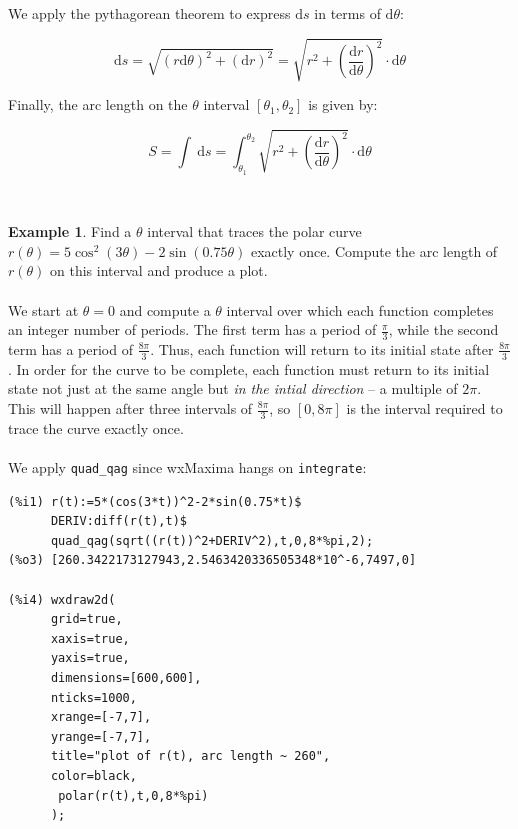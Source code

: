 \documentclass[10.5pt,twoside]{report}
\theoremstyle{definition}
\newtheorem{exmp}{Example}[section]
\begin{document}
We apply the pythagorean theorem to express $\mathrm{d}s$ in terms of $\mathrm{d}\theta$:

\[\mathrm{d}s=\sqrt{(r\mathrm{d}\theta)^2+(\mathrm{d}r)^2}=
\sqrt{r^2+\left(\frac{\mathrm{d}r}{\mathrm{d}\theta}\right)^2} \cdot \mathrm{d}\theta\]

Finally, the arc length on the $\theta$ interval $[\theta_1,\theta_2]$ is given by:

\[S=\int \ \mathrm{d}s = \int_{\theta_1}^{\theta_2} 
\sqrt{r^2+\left(\frac{\mathrm{d}r}{\mathrm{d}\theta}\right)^2} \cdot \mathrm{d}\theta\]

${}$\\

\begin{exmp}  Find a $\theta$ interval that traces the polar curve $r(\theta)=5\cos^2{(3\theta)}-2\sin{(0.75\theta)}$ exactly once.  Compute the arc length of $r(\theta)$ on this interval and produce a plot.\\

${}$\\



We start at $\theta=0$ and compute a $\theta$ interval over which each function completes an integer number of periods.  The first term has a period of $\frac{\pi}{3}$, while the second term has a period of $\frac{8\pi}{3}$.  Thus, each function will return to its initial state after $\frac{8\pi}{3}$.  In order for the curve to be complete, each function must return to its initial state not just at the same angle but \textit{in the intial direction} -- a multiple of $2\pi$.  This will happen after three intervals of $\frac{8\pi}{3}$, so $[0,8\pi]$ is the interval required to trace the curve exactly once.\\

${}$\\

We apply \verb|quad_qag| since wxMaxima hangs on \verb|integrate|:

\begin{verbatim}
(%i1) r(t):=5*(cos(3*t))^2-2*sin(0.75*t)$
      DERIV:diff(r(t),t)$
      quad_qag(sqrt((r(t))^2+DERIV^2),t,0,8*%pi,2);   
(%o3) [260.3422173127943,2.5463420336505348*10^-6,7497,0]

(%i4) wxdraw2d(
      grid=true,
      xaxis=true,
      yaxis=true,
      dimensions=[600,600],
      nticks=1000,
      xrange=[-7,7],
      yrange=[-7,7],
      title="plot of r(t), arc length ~ 260",
      color=black,
       polar(r(t),t,0,8*%pi)
      );
\end{verbatim}


\end{exmp}
\end{document}
